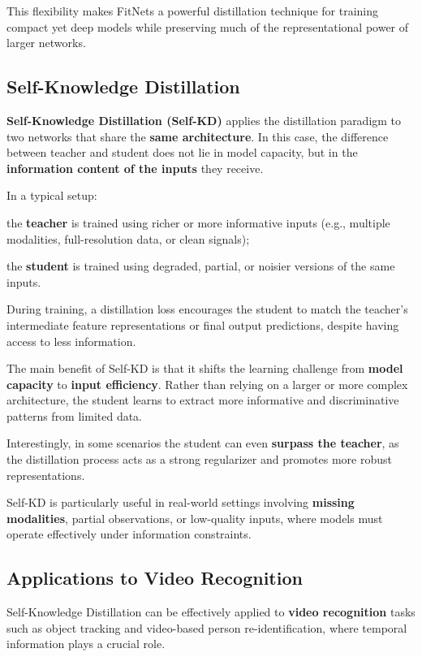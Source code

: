 This flexibility makes FitNets a powerful distillation technique for training compact yet deep
models while preserving much of the representational power of larger networks.

\subsection{Self-Knowledge Distillation}
\textbf{Self-Knowledge Distillation (Self-KD)} applies the distillation paradigm to two networks
that share the \textbf{same architecture}. In this case, the difference between teacher and
student does not lie in model capacity, but in the \textbf{information content of the inputs}
they receive.

In a typical setup:
\begin{compactitemize}
    \item the \textbf{teacher} is trained using richer or more informative inputs (e.g., multiple
    modalities, full-resolution data, or clean signals);
    \item the \textbf{student} is trained using degraded, partial, or noisier versions of the
    same inputs.
\end{compactitemize}

During training, a distillation loss encourages the student to match the teacher’s intermediate
feature representations or final output predictions, despite having access to less information.

The main benefit of Self-KD is that it shifts the learning challenge from \textbf{model capacity}
to \textbf{input efficiency}. Rather than relying on a larger or more complex architecture, the
student learns to extract more informative and discriminative patterns from limited data.

Interestingly, in some scenarios the student can even \textbf{surpass the teacher}, as the
distillation process acts as a strong regularizer and promotes more robust representations.

Self-KD is particularly useful in real-world settings involving \textbf{missing modalities},
partial observations, or low-quality inputs, where models must operate effectively under
information constraints.

\subsection{Applications to Video Recognition}
Self-Knowledge Distillation can be effectively applied to \textbf{video recognition} tasks such
as object tracking and video-based person re-identification, where temporal information plays a
crucial role.

